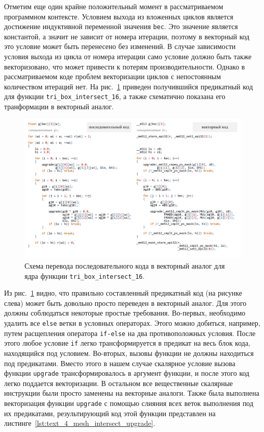 Отметим еще один крайне положительный момент в рассматриваемом программном контексте.
Условием выхода из вложенных циклов является достижение индуктивной переменной значения \texttt{bec}.
Это значение является константой, а значит не зависит от номера итерации, поэтому в векторный код это условие может быть перенесено без изменений.
В случае зависимости условия выхода из цикла от номера итерации само условие должно быть также векторизовано, что может привести к потерям производительности.
Однако в рассматриваемом коде проблем векторизации циклов с непостоянным количеством итераций нет.
На рис.~\ref{fig:text_1_mesh_intersect_scheme} приведен получившийся предикатный код для функции \texttt{tri\_box\_intersect\_16}, а также схематично показана его транформации в векторный аналог.

\begin{figure}[ht]
\centering
\includegraphics[width=1.0\textwidth]{./pics/text_4_mesh_intersect/final_scheme.pdf}
\singlespacing
{}\caption{Схема перевода последовательного кода в векторный аналог для ядра функции \texttt{tri\_box\_intersect\_16}.}
\label{fig:text_1_mesh_intersect_scheme}
\end{figure}

Из рис.~\ref{fig:text_1_mesh_intersect_scheme} видно, что правильно составленный предикатный код (на рисунке слева) может быть довольно просто переведен в векторный аналог.
Для этого должны соблюдаться некоторые простые требования.
Во-первых, необходимо удалить все \texttt{else} ветки в условных операторах.
Этого можно добиться, например, путем расщепления оператора \texttt{if-else} на два противоположных условия.
После этого любое условие \texttt{if} легко трансформируется в предикат на весь блок кода, находящийся под условием.
Во-вторых, вызовы функции не должны находиться под предикатами.
Вместо этого в нашем случае скалярное условие вызова функции \texttt{upgrade} трансформировалось в аргумент функции, и после этого код легко поддается векторизации.
В остальном все вещественные скалярные инструкции были просто заменены на векторные аналоги.
Также была выполнена векторизация функции \texttt{upgrade} с помощью слияния всех веток выполнения под их предикатами\label{term:meth_vec_merge2}, результирующий код этой функции представлен на листинге~\ref{lst:text_4_mesh_intersect_upgrade}.

